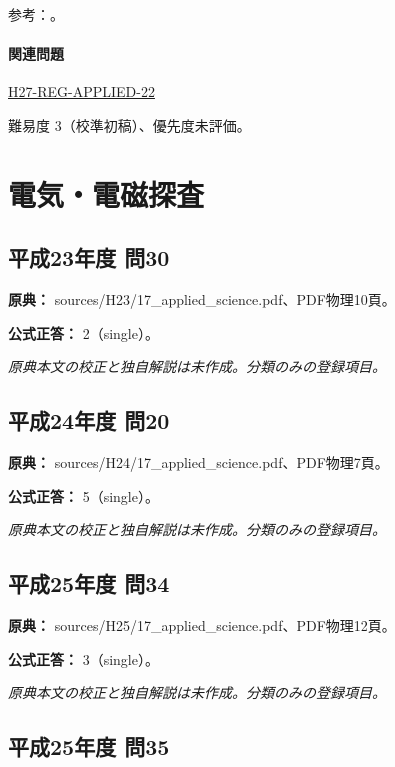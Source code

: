 \par 参考：\cite{gsi_gravity_definitions}。

\paragraph{関連問題} \hyperref[q:h27-reg-applied-22]{H27-REG-APPLIED-22}

\par 難易度 3（校準初稿）、優先度未評価。

\section{電気・電磁探査}

\subsection{平成23年度 問30}
\label{q:h23-reg-applied-30}

\noindent\textbf{原典：} sources/H23/17\_applied\_science.pdf、PDF物理10頁。

\textbf{公式正答：} 2（single）。

\par\textit{原典本文の校正と独自解説は未作成。分類のみの登録項目。}

\subsection{平成24年度 問20}
\label{q:h24-reg-applied-20}

\noindent\textbf{原典：} sources/H24/17\_applied\_science.pdf、PDF物理7頁。

\textbf{公式正答：} 5（single）。

\par\textit{原典本文の校正と独自解説は未作成。分類のみの登録項目。}

\subsection{平成25年度 問34}
\label{q:h25-reg-applied-34}

\noindent\textbf{原典：} sources/H25/17\_applied\_science.pdf、PDF物理12頁。

\textbf{公式正答：} 3（single）。

\par\textit{原典本文の校正と独自解説は未作成。分類のみの登録項目。}

\subsection{平成25年度 問35}
\label{q:h25-reg-applied-35}

